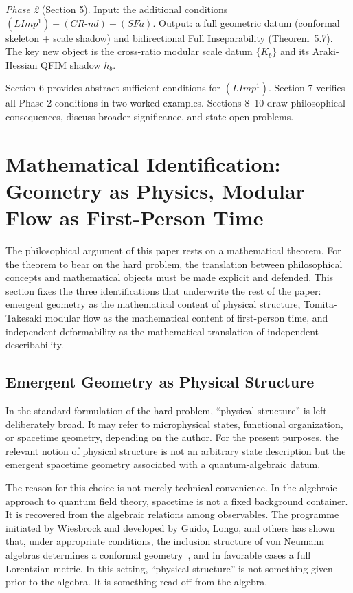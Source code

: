 \documentclass[12pt]{article}
\theoremstyle{definition}
\theoremstyle{remark}
\begin{document}
\emph{Phase 2} (Section 5). Input: the additional conditions
\((LImp^1)+(CR\text{-}nd)+(SFa)\). Output: a full geometric datum
(conformal skeleton + scale shadow) and bidirectional Full
Inseparability (Theorem~5.7). The key new object is the cross-ratio
modular scale datum \(\{K_b\}\) and its Araki-Hessian QFIM shadow
\(h_b\).

Section 6 provides abstract sufficient conditions for \((LImp^1)\).
Section 7 verifies all Phase 2 conditions in two worked examples.
Sections 8--10 draw philosophical consequences, discuss broader
significance, and state open problems.

\section{Mathematical Identification: Geometry as Physics, Modular Flow
as First-Person
Time}\label{mathematical-identification-geometry-as-physics-modular-flow-as-first-person-time}

The philosophical argument of this paper rests on a mathematical
theorem. For the theorem to bear on the hard problem, the translation
between philosophical concepts and mathematical objects must be made
explicit and defended. This section fixes the three identifications that
underwrite the rest of the paper: emergent geometry as the mathematical
content of physical structure, Tomita-Takesaki modular flow as the
mathematical content of first-person time, and independent deformability
as the mathematical translation of independent describability.

\subsection{Emergent Geometry as Physical
Structure}\label{emergent-geometry-as-physical-structure}

In the standard formulation of the hard problem, ``physical structure''
is left deliberately broad. It may refer to microphysical states,
functional organization, or spacetime geometry, depending on the author.
For the present purposes, the relevant notion of physical structure is
not an arbitrary state description but the emergent spacetime geometry
associated with a quantum-algebraic datum.

The reason for this choice is not merely technical convenience. In the
algebraic approach to quantum field theory, spacetime is not a fixed
background container. It is recovered from the algebraic relations among
observables. The programme initiated by Wiesbrock and developed by
Guido, Longo, and others has shown that, under appropriate conditions,
the inclusion structure of von Neumann algebras determines a conformal
geometry~\cite{Wiesbrock1993,GLW1998}, and in favorable cases a full Lorentzian metric. In this
setting, ``physical structure'' is not something given prior to the
algebra. It is something read off from the algebra.
\end{document}
